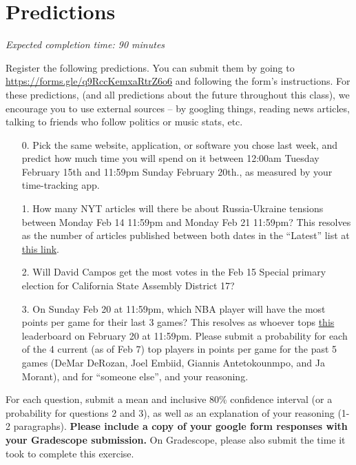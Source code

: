 \documentclass[11pt]{article}
\begin{document}
\section*{Predictions}

\emph{Expected completion time: 90 minutes}

Register the following predictions. You can submit them by going to \url{https://forms.gle/q9RccKemxaRtrZ6o6} and following the form's instructions. For these predictions, (and all predictions about the future throughout this class), we encourage you to use external sources -- by googling things, reading news articles, talking to friends who follow politics or music stats, etc.

\begin{enumerate}
	\item[0.] Pick the same website, application, or software you chose last week, and predict how much time you will spend on it between 12:00am Tuesday February 15th and 11:59pm Sunday February 20th., as measured by your time-tracking app.

	\item[1.] How many NYT articles will there be about Russia-Ukraine tensions between Monday Feb 14 11:59pm and Monday Feb 21 11:59pm? This resolves as the number of articles published between both dates in the ``Latest'' list at \href{https://www.nytimes.com/news-event/ukraine-russia?name=styln-russia-ukraine&region=TOP_BANNER&block=storyline_menu_recirc&action=click&pgtype=LegacyCollection&variant=0_Control}{this link}.

	\item[2.] Will David Campos get the most votes in the Feb 15 Special primary election for California State Assembly District 17?
 
	\item[3.] On Sunday Feb 20 at 11:59pm, which NBA player will have the most points per game for their last 3 games? This resolves as whoever tops \href{https://www.nba.com/stats/players/traditional/?sort=PTS&dir=-1&Season=2021-22&SeasonType=Regular%20Season&LastNGames=3}{this} leaderboard on February 20 at 11:59pm. Please submit a probability for each of the 4 current (as of Feb 7) top players in points per game for the past 5 games (DeMar DeRozan, Joel Embiid, Giannis Antetokounmpo, and Ja Morant), and for ``someone else'', and your reasoning. 
\end{enumerate}

For each question, submit a mean and inclusive 80\% confidence interval (or a probability for questions 2 and 3), as well as an explanation of your reasoning (1-2 paragraphs). \textbf{Please include a copy of your google form responses with your Gradescope submission.} On Gradescope, please also submit the time it took to complete this exercise.
\end{document}
